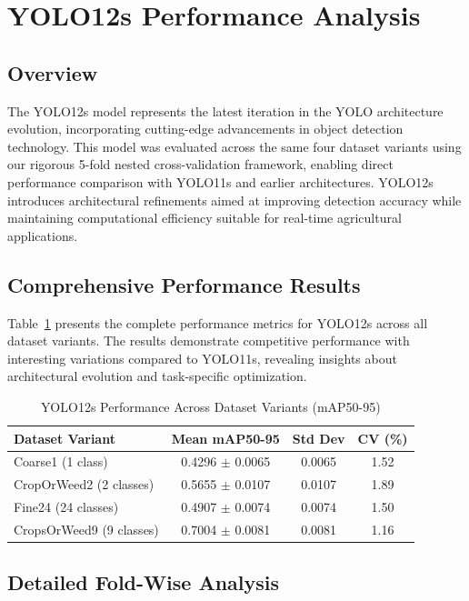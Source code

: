 \section{YOLO12s Performance Analysis}

\subsection{Overview}

The YOLO12s model represents the latest iteration in the YOLO architecture evolution, incorporating cutting-edge advancements in object detection technology. This model was evaluated across the same four dataset variants using our rigorous 5-fold nested cross-validation framework, enabling direct performance comparison with YOLO11s and earlier architectures. YOLO12s introduces architectural refinements aimed at improving detection accuracy while maintaining computational efficiency suitable for real-time agricultural applications.

\subsection{Comprehensive Performance Results}

Table~\ref{tab:yolo12s_results} presents the complete performance metrics for YOLO12s across all dataset variants. The results demonstrate competitive performance with interesting variations compared to YOLO11s, revealing insights about architectural evolution and task-specific optimization.

\begin{table}[htbp]
\centering
\caption{YOLO12s Performance Across Dataset Variants (mAP50-95)}
\label{tab:yolo12s_results}
\begin{tabular}{lccc}
\toprule
\textbf{Dataset Variant} & \textbf{Mean mAP50-95} & \textbf{Std Dev} & \textbf{CV (\%)} \\
\midrule
Coarse1 (1 class)        & 0.4296 $\pm$ 0.0065 & 0.0065 & 1.52 \\
CropOrWeed2 (2 classes)  & 0.5655 $\pm$ 0.0107 & 0.0107 & 1.89 \\
Fine24 (24 classes)      & 0.4907 $\pm$ 0.0074 & 0.0074 & 1.50 \\
CropsOrWeed9 (9 classes) & 0.7004 $\pm$ 0.0081 & 0.0081 & 1.16 \\
\bottomrule
\end{tabular}
\end{table}

\subsection{Detailed Fold-Wise Analysis}

